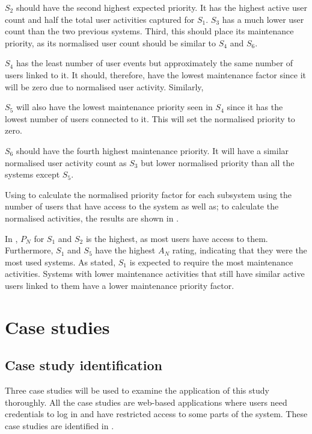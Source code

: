 $S_2$ should have the second highest expected priority. It has the highest active user count and half the total user activities captured for $S_1$. $S_3$ has a much lower user count than the two previous systems. Third, this should place its maintenance priority, as its normalised user count should be similar to $S_4$ and $S_6$. \par $S_4$ has the least number of user events but approximately the same number of users linked to it. It should, therefore, have the lowest maintenance factor since it will be zero due to normalised user activity. Similarly, \par $S_5$ will also have the lowest maintenance priority seen in $S_4$ since it has the lowest number of users connected to it. This will set the normalised priority to zero. \par $S_6$ should have the fourth highest maintenance priority. It will have a similar normalised user activity count as $S_3$ but lower normalised priority than all the systems except $S_5$. \par Using  to calculate the normalised priority factor for each subsystem using the number of users that have access to the system as well as;  to calculate the normalised activities, the results are shown in .



In , $P_N$ for $S_1$ and $S_2$ is the highest, as most users have access to them. Furthermore, $S_1$ and $S_5$ have the highest $A_N$ rating, indicating that they were the most used systems. As stated, $S_1$ is expected to require the most maintenance activities. Systems with lower maintenance activities that still have similar active users linked to them have a lower maintenance priority factor.

\clearpage

\section{Case studies}\label{sec:ch3_caseStudies}

\subsection{Case study identification}
Three case studies will be used to examine the application of this study thoroughly. All the case studies are web-based applications where users need credentials to log in and have restricted access to some parts of the system. These case studies are identified in .


